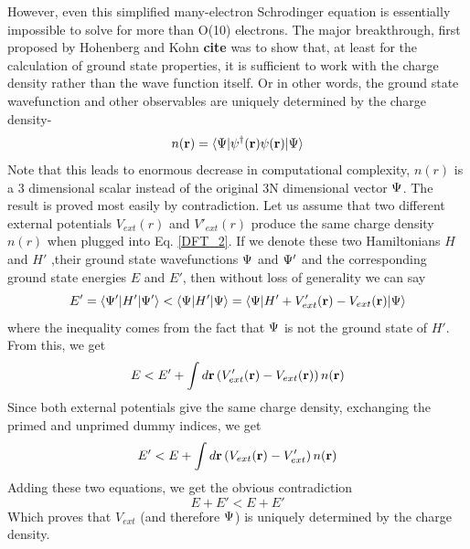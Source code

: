 \documentclass[10pt]{ruthesis}
\begin{document}
However, even this simplified many-electron Schrodinger equation is essentially impossible to solve for more than O(10) electrons. The major breakthrough, first proposed by Hohenberg and Kohn \textbf{cite} was to show that, at least for the calculation of ground state properties, it is sufficient to work with the charge density rather than the wave function itself. Or in other words, the ground state wavefunction and other observables are uniquely determined  by the charge density-
\begin{equation}
n(\mathbf{r})= \langle \Psi|\psi^\dagger (\mathbf{r}) \psi(\mathbf{r}) | \Psi\rangle 
\end{equation}
Note that this leads to enormous decrease in computational complexity, $n(r)$ is a 3 dimensional scalar instead of the original 3N dimensional vector $\Psi$.  The result is proved most easily by contradiction. Let us assume that two different external potentials $V_{ext} (r)$ and $V'_{ext} (r)$ produce the same charge density $n(r)$
when plugged into Eq. \ref{DFT_2}. If we denote these two Hamiltonians $H$ and $H'$ ,their ground state wavefunctions $\Psi$ and $\Psi'$ and the corresponding ground state energies $E$ and $E'$, then without loss of generality we can say
\begin{equation}
E'=\langle \Psi' | H' |\Psi' \rangle < \langle \Psi | H' |\Psi \rangle = \langle \Psi | H' + V'_{ext} (\mathbf{r}) -V_{ext} (\mathbf{r})   |\Psi \rangle
\end{equation}
where the inequality comes from the fact that $\Psi$ is not the ground state of $H'$. From this, we get
\begin{equation}
E < E' + \int d\mathbf{r} \left( V'_{ext} (\mathbf{r}) -V_{ext}(\mathbf{r}) \right) n(\mathbf{r})
\end{equation}
Since both external potentials give the same charge density, exchanging the primed and unprimed dummy indices, we get
\begin{equation}
E' < E + \int d\mathbf{r} \left( V_{ext} (\mathbf{r}) -V'_{ext} \right) n(\mathbf{r})
\end{equation}
Adding these two equations, we get the obvious contradiction
\begin{equation}
E+E' < E+E'
\end{equation}
 Which proves that $V_{ext}$ (and therefore $\Psi$) is uniquely determined by the charge density.
\end{document}
